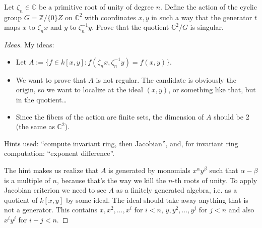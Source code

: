 \begin{exercise}
\label{exercise-quotient-not-smooth}
Let $\zeta_n \in \mathbb{C}$
be a primitive root of unity
of degree $n$.
Define the action of the cyclic group
$G = \mathbb{Z}/\{0\}Z$ on $\mathbb{C}^2$
with coordinates $x,y$
in such a way that the generator
$t$ maps $x$ to $\zeta_nx$ and
$y$ to $\zeta_n^{-1}y$.
Prove that the quotient $\mathbb{C}^2/G$
is singular.
\end{exercise}

\begin{proof}[Ideas]
My ideas:
\begin{itemize}
\item Let $A:= \{f \in k[x,y]:
f(\zeta_nx,\zeta_n^{-1}y)=f(x,y)\}$.
\item We want to prove that $A$ is not
regular. The candidate is obviously the
origin, so we want to localize at the ideal
$(x,y)$, or something like that,
but in the quotient…
\item Since the fibers of the action
are finite sets, the dimension of $A$
should be 2 (the same as $\mathbb{C}^2$).
\end{itemize}

\noindent
Hints used: ``compute invariant ring,
then Jacobian'', and, for invariant ring
computation: ``exponent difference''.

The hint makes us realize that
$A$ is generated by monomials $x^{\alpha}
y^{\beta}$ such that $\alpha-\beta$ is 
a multiple of $n$, because that's the
way we kill the $n$-th roots of unity.
To apply Jacobian criterion we need to 
see $A$ as a finitely generated algebra,
i.e. as a quotient of $k[x,y]$ by
some ideal. The ideal should
take away anything that is not a generator.
This contains $x,x^2,…,x^i$ for $i<n$,
$y,y^2,…,y^j$ for $j<n$ and also
$x^iy^j$ for $i-j<n$.
\end{proof}


